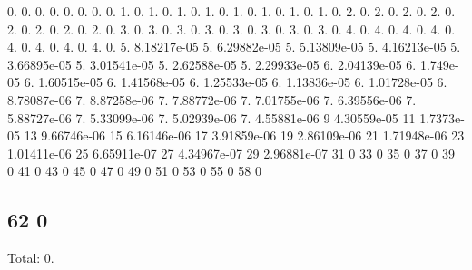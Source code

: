 0. 0. 0. 0. 0. 0. 0. 0. 1. 0. 1. 0. 1. 0. 1. 0. 1. 0. 1. 0. 1. 0. 1. 0. 2. 0. 2. 0. 2. 0. 2. 0. 2. 0. 2. 0. 2. 0. 2. 0. 3. 0. 3. 0. 3. 0. 3. 0. 3. 0. 3. 0. 3. 0. 3. 0. 4. 0. 4. 0. 4. 0. 4. 0. 4. 0. 4. 0. 4. 0. 4. 0. 5. 8.\+18217e-\/05 5. 6.\+29882e-\/05 5. 5.\+13809e-\/05 5. 4.\+16213e-\/05 5. 3.\+66895e-\/05 5. 3.\+01541e-\/05 5. 2.\+62588e-\/05 5. 2.\+29933e-\/05 6. 2.\+04139e-\/05 6. 1.\+749e-\/05 6. 1.\+60515e-\/05 6. 1.\+41568e-\/05 6. 1.\+25533e-\/05 6. 1.\+13836e-\/05 6. 1.\+01728e-\/05 6. 8.\+78087e-\/06 7. 8.\+87258e-\/06 7. 7.\+88772e-\/06 7. 7.\+01755e-\/06 7. 6.\+39556e-\/06 7. 5.\+88727e-\/06 7. 5.\+33099e-\/06 7. 5.\+02939e-\/06 7. 4.\+55881e-\/06 9 4.\+30559e-\/05 11 1.\+7373e-\/05 13 9.\+66746e-\/06 15 6.\+16146e-\/06 17 3.\+91859e-\/06 19 2.\+86109e-\/06 21 1.\+71948e-\/06 23 1.\+01411e-\/06 25 6.\+65911e-\/07 27 4.\+34967e-\/07 29 2.\+96881e-\/07 31 0 33 0 35 0 37 0 39 0 41 0 43 0 45 0 47 0 49 0 51 0 53 0 55 0 58 0 \subsection*{62 0 }

Total\+: 0. 